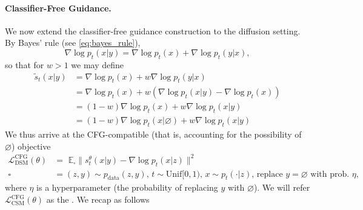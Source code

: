 \paragraph{Classifier-Free Guidance.} We now extend the classifier-free guidance construction to the diffusion setting. By Bayes' rule (see \cref{eq:bayes_rule}),
\begin{equation*}
    \nabla \log p_t(x|y) = \nabla \log p_t(x) + \nabla \log p_t(y|x),
\end{equation*}
so that for  $w > 1$ we may define
\begin{align*}
    \tilde{s}_t(x|y) &= \nabla \log p_t(x) + w \nabla \log p_t(y|x)\\
                    &= \nabla \log p_t(x) + w (\nabla \log p_t(x|y) - \nabla \log p_t(x))\\
                    &= (1-w) \nabla \log p_t(x) + w \nabla \log p_t(x|y)\\
                    &= (1-w) \nabla \log p_t(x|\varnothing) + w \nabla \log p_t(x|y)
\end{align*}
We thus arrive at the CFG-compatible (that is, accounting for the possibility of $\varnothing$) objective 
\begin{align}
    \label{eq:cfg_guided_dsm}
    \mathcal{L}_{\text{DSM}}^{\text{CFG}}(\theta) &= \,\,\mathbb{E}_{\square} \lVert s_t^{\theta}(x|y) - \nabla \log p_t(x|z)\rVert^2\\
    \square &= (z,y) \sim p_{\text{data}}(z,y),\, t \sim \text{Unif}[0,1),\, x \sim p_t(\cdot|z),\,\text{replace }y=\varnothing\text{ with prob. }\eta,
\end{align}
where $\eta$ is a hyperparameter (the probability of replacing $y$ with $\varnothing$). We will refer $\mathcal{L}_{\text{CSM}}^{\text{CFG}}(\theta)$ as the . We recap as follows


